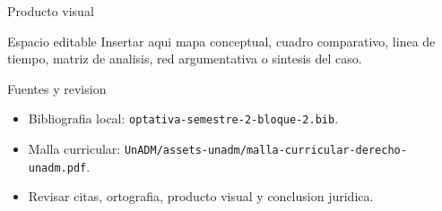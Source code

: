 \documentclass[
  spanish,
  aspectratio=169,
  xcolor={dvipsnames,table}
]{beamer}
\begin{document}
\begin{frame}{Producto visual}
  \begin{block}{Espacio editable}
    Insertar aqui mapa conceptual, cuadro comparativo, linea de tiempo,
    matriz de analisis, red argumentativa o sintesis del caso.
  \end{block}
  \centering
\end{frame}

\begin{frame}{Fuentes y revision}
  \begin{itemize}
    \item Bibliografia local: \texttt{optativa-semestre-2-bloque-2.bib}.
    \item Malla curricular: \texttt{UnADM/assets-unadm/malla-curricular-derecho-unadm.pdf}.
    \item Revisar citas, ortografia, producto visual y conclusion juridica.
  \end{itemize}
\end{frame}
\end{document}
